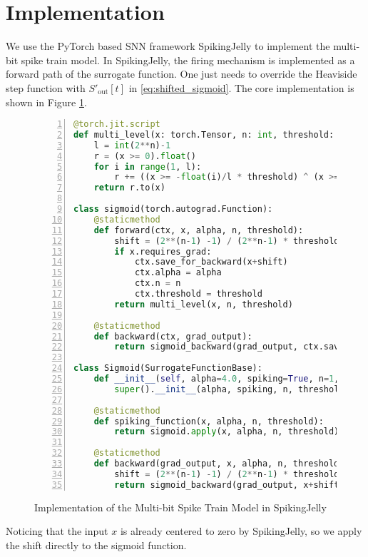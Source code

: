 \section{Implementation}
\label{sec:implementation}

    We use the PyTorch based SNN framework SpikingJelly to implement the multi-bit spike train model. In SpikingJelly, the firing mechanism is implemented as a forward path of the surrogate function. One just needs to override the Heaviside step function with $S'_{\text{out}}[t]$ in \ref{eq:shifted_sigmoid}. The core implementation is shown in Figure \ref{listing:multi-bit-spike}.
    \begin{figure}[!htpb]
        \centering
        \begin{lstlisting}[language=Python, basicstyle=\small, breaklines=true, numbers=left, stepnumber=1]
@torch.jit.script
def multi_level(x: torch.Tensor, n: int, threshold: float):
    l = int(2**n)-1
    r = (x >= 0).float()
    for i in range(1, l):
        r += ((x >= -float(i)/l * threshold) ^ (x >= -float(i-1)/l * threshold)) * float(l-i)/l
    return r.to(x)

class sigmoid(torch.autograd.Function):
    @staticmethod
    def forward(ctx, x, alpha, n, threshold):
        shift = (2**(n-1) -1) / (2**n-1) * threshold
        if x.requires_grad:
            ctx.save_for_backward(x+shift)
            ctx.alpha = alpha
            ctx.n = n
            ctx.threshold = threshold
        return multi_level(x, n, threshold)

    @staticmethod
    def backward(ctx, grad_output):
        return sigmoid_backward(grad_output, ctx.saved_tensors[0], ctx.alpha, ctx.n, ctx.threshold)

class Sigmoid(SurrogateFunctionBase):
    def __init__(self, alpha=4.0, spiking=True, n=1, threshold=1.0):
        super().__init__(alpha, spiking, n, threshold)

    @staticmethod
    def spiking_function(x, alpha, n, threshold):
        return sigmoid.apply(x, alpha, n, threshold)

    @staticmethod
    def backward(grad_output, x, alpha, n, threshold):
        shift = (2**(n-1) -1) / (2**n-1) * threshold
        return sigmoid_backward(grad_output, x+shift, alpha, n, threshold)[0]
        \end{lstlisting}
        \caption{Implementation of the Multi-bit Spike Train Model in SpikingJelly}
        \label{listing:multi-bit-spike}
    \end{figure}

    Noticing that the input $x$ is already centered to zero by SpikingJelly, so we apply the shift directly to the sigmoid function. 
